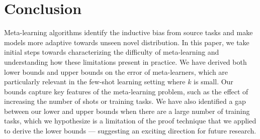 \section{Conclusion}
\vspace{-0.1in}
Meta-learning algorithms identify the inductive bias from source tasks and make models more adaptive towards unseen novel distribution.
In this paper, we take initial steps towards characterizing the difficulty of meta-learning and understanding how these limitations present in practice. We have derived both lower bounds and upper bounds on the error of meta-learners, which are particularly relevant in the few-shot learning setting where $k$ is small. Our bounds capture key features of the meta-learning problem, such as the effect of increasing the number of shots or training tasks.
We have also identified a gap between our lower and upper bounds when there are a large number of training tasks, which we hypothesize is a limitation of the proof technique that we applied to derive the lower bounds --- suggesting an exciting direction for future research.

